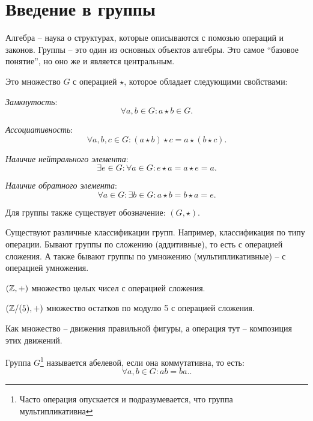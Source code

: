 \section{Введение в группы}

Алгебра -- наука о структурах, которые описываются с помозью операций и законов. 
Группы -- это один из основных объектов алгебры. Это самое ``базовое понятие'', 
но оно же и является центральным.

\begin{definition}
    [Группа]
    Это множество $G$ с операцией $\star$, которое обладает следующими свойствами: 
    \begin{conditions}
        \item \textit{Замкнутость}: $$\forall a, b \in G: a \star b \in G.$$
        \item \textit{Ассоциативность}: $$\forall a, b, c \in G: (a \star b) \star c = a \star (b \star c).$$
        \item \textit{Наличие нейтрального элемента}: $$\exists e \in G: \forall a \in G: e \star a = a \star e = a.$$
        \item \textit{Наличие обратного элемента}: $$\forall a \in G: \exists b \in G: a \star b = b \star a = e.$$
    \end{conditions}
    Для группы также существует обозначение: $(G, \star).$
\end{definition}

Существуют различные классификации групп. Например, классификация по типу операции. 
Бывают группы по сложению (аддитивные), то есть с операцией сложения. 
А также бывают группы по умножению (мультипликативные) -- с операцией умножения.

\begin{example}
        $(\mathbb Z, +)$ множество целых чисел с операцией сложения.
\end{example}
\begin{example}
    $({\mathbb Z}/{(5)}, +)$ множество остатков по модулю 5 с операцией сложения.
\end{example}
\begin{example}
    Как множество -- движения правильной фигуры, а операция тут -- композиция этих движений.
\end{example}

\begin{definition}
    Группа $G$\footnote{Часто операция опускается и подразумевается, что группа мультипликативна} 
    называется абелевой, если она коммутативна, то есть: \[
        \forall a, b \in G: ab = ba.
    .\] 
\end{definition}


